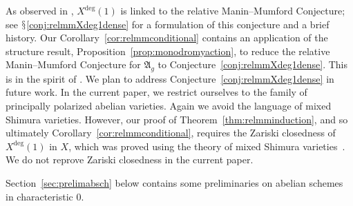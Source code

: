 \documentclass[12pt,oneside]{amsart}
\begin{document}
As observed in \cite[$\mathsection
11$]{GaoBettiRank},  $X^{\mathrm{deg}}(1)$ is linked to the
relative Manin--Mumford Conjecture; see $\mathsection$\ref{conj:relmmXdeg1dense} for a
formulation of this conjecture and a brief history. %
Our Corollary~\ref{cor:relmmconditional}
 contains an application of the structure
result, Proposition~\ref{prop:monodromyaction}, to reduce the relative
Manin--Mumford Conjecture for $\mathfrak{A}_g$ to
Conjecture~\ref{conj:relmmXdeg1dense}. This is in the spirit of
\cite[Proposition 11.2]{GaoBettiRank}. We plan to address
Conjecture~\ref{conj:relmmXdeg1dense} in future work.
In the current paper,  we restrict ourselves to the
family of principally polarized abelian varieties.
Again we avoid the language of mixed Shimura varieties. However,
our proof of Theorem~\ref{thm:relmminduction}, and so ultimately Corollary~\ref{cor:relmmconditional},
requires the Zariski closedness of $X^{\mathrm{deg}}(1)$ in $X$, which was 
 proved using the theory of mixed Shimura varieties~\cite[Theorem~1.8]{GaoBettiRank}. We do not reprove Zariski closedness in the current
paper. 




  
   
\smallskip

Section~\ref{sec:prelimabsch} below contains some preliminaries on abelian schemes in
characteristic $0$.



\end{document}

